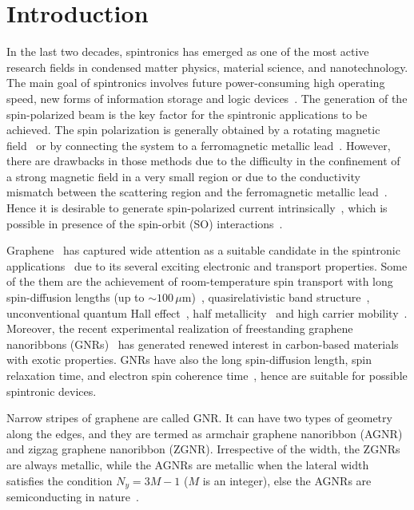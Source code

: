 \documentclass[prb,aps,twocolumn,amsmath,amssymb,floatfix,
superscriptaddress]{revtex4}
\begin{document}
\section{\label{sec1}Introduction}
In the last two decades, spintronics has emerged as one of the most
active research fields in condensed matter physics, material science,
and nanotechnology. The main goal of spintronics involves future
power-consuming high operating speed, new forms of information storage
and logic devices~\cite{wolf,santanu-epl-18}. The generation of the
spin-polarized beam is the key factor for the spintronic applications
to be achieved. The spin polarization is generally obtained by a
rotating magnetic field~\cite{pzhang-prl} or by connecting the system
to a ferromagnetic metallic lead~\cite{dutta-das}. However, there are
drawbacks in those methods due to the difficulty in the confinement of
a strong magnetic field in a very small region or due to the
conductivity mismatch between the scattering region and the
ferromagnetic metallic lead~\cite{Schmidt}. Hence it is desirable to
generate spin-polarized current intrinsically~\cite{l-l}, which is
possible in presence of the spin-orbit (SO)
interactions~\cite{qfsun-prb71,santanu-jap-11,qfsun-prb73,hfl,fchi-apl,gong-apl,jap-santanu,santanu-epjb}.


Graphene~\cite{novo} has captured wide attention as a suitable
candidate in the spintronic applications~\cite{neto} due to its
several exciting electronic and transport properties. Some of the them
are the achievement of room-temperature spin transport with long
spin-diffusion lengths (up to $\sim 100\,\mu$m)~\cite{luis,tombros,
  zomer,yang,han}, quasirelativistic band structure~\cite{novo,zhang},
unconventional quantum Hall effect~\cite {novo,zhang,vp}, half
metallicity~\cite{jun,lin} and high carrier
mobility~\cite{du,bolotin}. Moreover, the recent experimental
realization of freestanding graphene nanoribbons
(GNRs)~\cite{meyer,moro} has generated renewed interest in
carbon-based materials with exotic properties. GNRs have also the long
spin-diffusion length, spin relaxation time, and electron spin
coherence time~\cite{yazyev-prb,yazyev-prl,cantele}, hence are
suitable for possible spintronic devices.


Narrow stripes of graphene are called GNR. It can have two types of
geometry along the edges, and they are termed as armchair graphene
nanoribbon (AGNR) and zigzag graphene nanoribbon (ZGNR). Irrespective
of the width, the ZGNRs are always metallic, while the AGNRs are
metallic when the lateral width satisfies the condition $N_y = 3M-1$
($M$ is an integer), else the AGNRs are semiconducting in
nature~\cite{fujita}.
\end{document}
